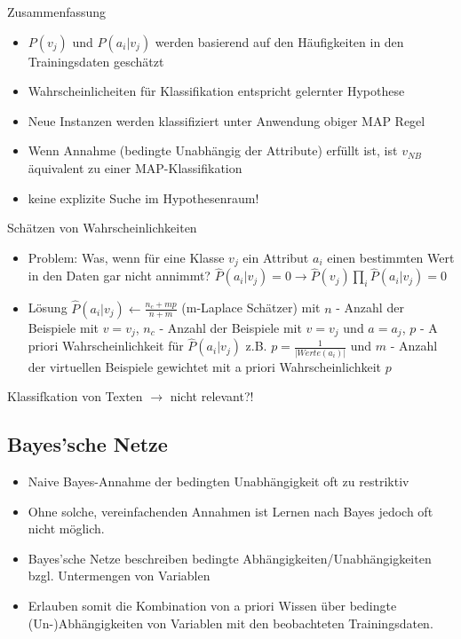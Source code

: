 \documentclass[paper=a4, fontsize=11pt]{scrartcl} %
\numberwithin{equation}{section} %
\numberwithin{figure}{section} %
\numberwithin{table}{section} %
\begin{document}
Zusammenfassung
\begin{itemize}
\item $P(v_j)$ und $P(a_i|v_j)$ werden basierend auf den Häufigkeiten in den Trainingsdaten geschätzt
\item Wahrscheinlicheiten für Klassifikation entspricht gelernter Hypothese
\item Neue Instanzen werden klassifiziert unter Anwendung obiger MAP Regel
\item Wenn Annahme (bedingte Unabhängig der Attribute) erfüllt ist, ist $v_{NB}$ äquivalent zu einer MAP-Klassifikation
\item keine explizite Suche im Hypothesenraum!
\end{itemize}

Schätzen von Wahrscheinlichkeiten
\begin{itemize}
\item Problem: Was, wenn für eine Klasse $v_j$ ein Attribut $a_i$ einen bestimmten Wert in den Daten gar nicht annimmt? $\hat{P}(a_i|v_j) = 0 \rightarrow \hat{P}(v_j) \prod\limits_i \hat{P}(a_i|v_j) = 0$
\item Lösung $\hat{P}(a_i|v_j) \leftarrow \frac{n_c + mp}{n+m}$ (m-Laplace Schätzer) mit $n$ - Anzahl der Beispiele mit $v = v_j$, $n_c$ - Anzahl der Beispiele mit $v = v_j$ und $a = a_j$, $p$ - A priori Wahrscheinlichkeit für $\hat{P}(a_i|v_j)$ z.B. $p = \frac{1}{|Werte(a_i)|}$ und $m$ - Anzahl der virtuellen Beispiele gewichtet mit a priori Wahrscheinlichkeit $p$
\end{itemize}

Klassifkation von Texten $\rightarrow$ nicht relevant?!

\subsection{Bayes'sche Netze}

\begin{itemize}
\item Naive Bayes-Annahme der bedingten Unabhängigkeit oft zu restriktiv
\item Ohne solche, vereinfachenden Annahmen ist Lernen nach Bayes jedoch oft nicht möglich.
\item Bayes'sche Netze beschreiben bedingte Abhängigkeiten/Unabhängigkeiten bzgl. Untermengen von Variablen
\item Erlauben somit die Kombination von a priori Wissen über bedingte (Un-)Abhängigkeiten von Variablen mit den beobachteten Trainingsdaten.
\end{itemize}
\end{document}
